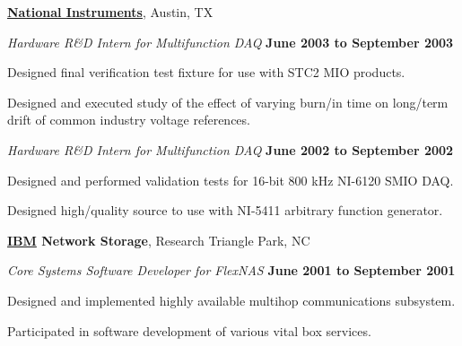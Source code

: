 \documentclass[10pt]{article}
\newcommand{\halfblankline}{\quad\vspace{-0.5\baselineskip}\pagebreak[3]}
\begin{document}
\href{http://www.ni.com/}{\textbf{National Instruments}},
Austin, TX
\begin{outerlist}

\item[] \textit{Hardware R\&D Intern for Multifunction DAQ}%
        \hfill \textbf{June 2003 to September 2003}
\begin{innerlist}
\item Designed final verification test fixture for use with STC2 MIO
        products.
\item Designed and executed study of the effect of varying burn\-/in time
        on long\-/term drift of common industry voltage references.
\end{innerlist}

\item[] \textit{Hardware R\&D Intern for Multifunction DAQ}%
        \hfill \textbf{June 2002 to September 2002}
\begin{innerlist}
\item Designed and performed validation tests for 16-bit 800 kHz
        NI-6120 SMIO DAQ.

\item Designed high\-/quality source to use with NI-5411 arbitrary
        function generator.
\end{innerlist}

\end{outerlist}

\halfblankline

\textbf{\href{http://www.ibm.com/}{IBM} Network Storage},
Research Triangle Park, NC
\begin{outerlist}

\item[] \textit{Core Systems Software Developer for FlexNAS}%
        \hfill \textbf{June 2001 to September 2001}
\begin{innerlist}
\item Designed and implemented highly available multihop communications
        subsystem.
\item Participated in software development of various vital box
        services.
\end{innerlist}

\end{outerlist}

\halfblankline
\end{document}
